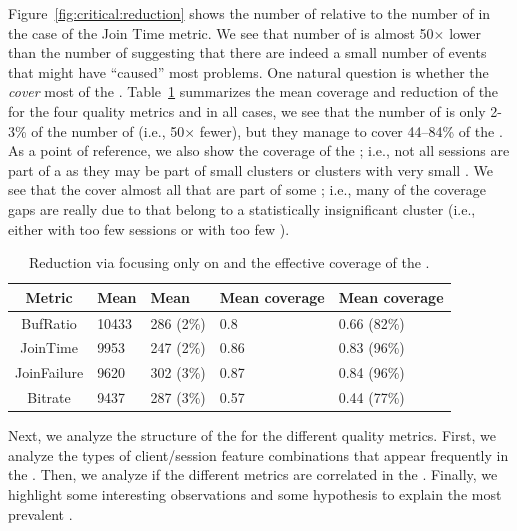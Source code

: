 Figure~\ref{fig:critical:reduction} shows the number of 
\problemclusters relative to the number of \criticalclusters 
in the case of the Join Time metric. 
We see that  number of \criticalclusters is almost 
50$\times$ lower than the number of \problemclusters 
suggesting that there are indeed a small number of 
events that might have ``caused''  most  problems.  
One natural question is whether  the \criticalclusters 
\emph{cover} most of the \problemsessions. 
Table~\ref{tab:critical:reduction} summarizes the mean 
coverage and reduction  of the \criticalclusters for the four 
quality metrics and in all cases, we see that the number of 
\criticalclusters is only   2-3\% of the number of 
\problemclusters (i.e., 50$\times$ fewer), but they manage to
cover 44--84\% of the \problemsessions. 
As a point of reference,  we also show the coverage of 
the \problemclusters; i.e., not  all sessions are part of a 
\problemcluster as they may be part of  small clusters or 
clusters with very small \problemratio. 
We see that the \criticalclusters cover almost all 
\problemsessions that are part of some \problemcluster; 
i.e., many of the coverage  gaps are really due to 
\problemsessions that belong to a statistically insignificant 
cluster (i.e., either with too few sessions or with 
too few \problemsessions).
 
 
\begin{table}[t]
\begin{center}
\begin{small}
\begin{tabular}{c|p{2cm}|p{2cm}|p{2.5cm}|p{2.5cm}}
Metric	& Mean \problemclusters & Mean \criticalclusters & Mean \problemcluster coverage & Mean \criticalcluster coverage\\ \hline 
BufRatio	 & 10433 & 286 (2\%) & 0.8 & 0.66 (82\%) \\
JoinTime & 9953 & 247 (2\%) & 0.86 & 0.83 (96\%) \\
JoinFailure & 9620 & 302 (3\%) & 0.87 & 0.84 (96\%)\\
Bitrate & 9437 & 287 (3\%) & 0.57 & 0.44 (77\%)
\end{tabular}
\end{small}
\end{center}
\caption{Reduction via focusing only on \criticalclusters 
and the effective coverage  of the \criticalclusters.}
\label{tab:critical:reduction}
\end{table}


Next, we analyze the structure of the \criticalclusters for 
the different quality metrics. 
First, we analyze the types of  client/session  feature 
combinations that appear frequently in the \criticalclusters. 
Then, we analyze if the different metrics are correlated in the 
\criticalclusters. Finally, we highlight some interesting 
observations  and some hypothesis to explain  
the most prevalent \criticalclusters. 



